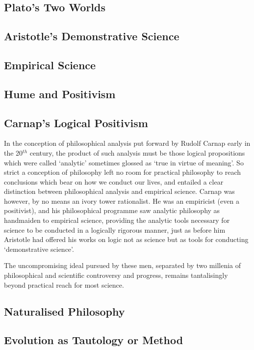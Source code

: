 \documentclass[10pt,titlepage]{book}
\begin{document}
\subsection{Plato's Two Worlds}

\subsection{Aristotle's Demonstrative Science}

\subsection{Empirical Science}

\subsection{Hume and Positivism}

\subsection{Carnap's Logical Positivism}

In the conception of philosophical analysis put forward by Rudolf Carnap early in the 20$^{th}$ century, the product of such analysis must be those logical propositions which were called `analytic' sometimes glossed as `true in virtue of meaning'.
So strict a conception of philosophy left no room for practical philosophy to reach conclusions which bear on how we conduct our lives, and entailed a clear distinction between philosophical analysis and empirical science.
Carnap was however, by no means an ivory tower rationalist.
He was an empiricist (even a positivist), and his philosophical programme saw analytic philosophy as handmaiden to empirical science, providing the analytic tools necessary for science to be conducted in a logically rigorous manner, just as before him Aristotle had offered his works on logic not as science but as tools for conducting `demonstrative science'.

The uncompromising ideal pursued by these men, separated by two millenia of philosophical and scientific controversy and progress, remains tantalisingly beyond practical reach for most science.

\subsection{Naturalised Philosophy}


\subsection{Evolution as Tautology or Method}
\end{document}
